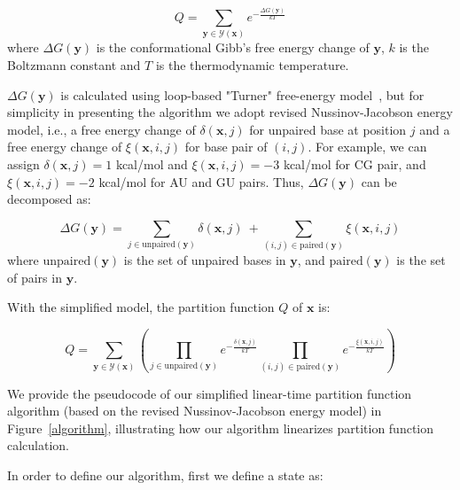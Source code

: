 \begin{equation}
	Q=\sum_{\mathbf{y} \in \mathcal{Y(\mathbf x)}} e^{-\frac{\Delta G({\mathbf{y}})}{kT}}
\end{equation}
where $\Delta G({\mathbf{y}})$ is the  conformational Gibb’s free energy change of $\mathbf{y}$, $k$ is the Boltzmann constant and $T$ is the thermodynamic temperature.

$\Delta G({\mathbf{y}})$ is calculated using loop-based "Turner" free-energy model~\cite{mathews+:1999, Mathews+:2004}, 
but for simplicity in presenting the algorithm we adopt revised Nussinov-Jacobson energy model, 
i.e., a free energy change of $\delta(\mathbf{x}, j)$ for unpaired base at position $j$ 
and a free energy change of $\xi(\mathbf{x}, i, j)$ for base pair of $(i,j)$.
For example, we can assign $\delta(\mathbf{x}, j)=1$ kcal/mol and $\xi(\mathbf{x}, i, j)=-3$ kcal/mol for CG pair, and $\xi(\mathbf{x}, i, j)=-2$ kcal/mol for AU and GU pairs. 
Thus, $\Delta G({\mathbf{y}})$
can be decomposed as:

\begin{equation}
	\Delta G({\mathbf{y}}) = \sum_{j \in {\textrm {unpaired}}(\mathbf{y})} \delta(\mathbf{x}, j) \ + \sum_{(i,j) \in {\textrm{paired}}(\mathbf{y})} \xi(\mathbf{x}, i, j)
\end{equation}
where ${\textrm {unpaired}}(\mathbf{y})$ is the set of unpaired bases in $\mathbf{y}$, 
and ${\textrm {paired}}(\mathbf{y})$ is the set of pairs in $\mathbf{y}$.

With the simplified model, the partition function $Q$ of $\mathbf{x}$ is:

\begin{equation}
	Q=\sum_{\mathbf{y} \in \mathcal{Y(\mathbf x)}} (\prod_{j \in {\textrm {unpaired}}(\mathbf{y})} e^{-\frac{\delta(\mathbf{x}, j)}{kT}} \prod_{(i,j) \in {\textrm{paired}}(\mathbf{y})} e^{-\frac{\xi(\mathbf{x}, i, j)}{kT}})
\end{equation}


We provide the pseudocode of our simplified linear-time partition function algorithm (based on the revised Nussinov-Jacobson energy model) in Figure~\ref{algorithm},
illustrating how our algorithm linearizes partition function calculation. 

In order to define our algorithm, first we define a state as: 

